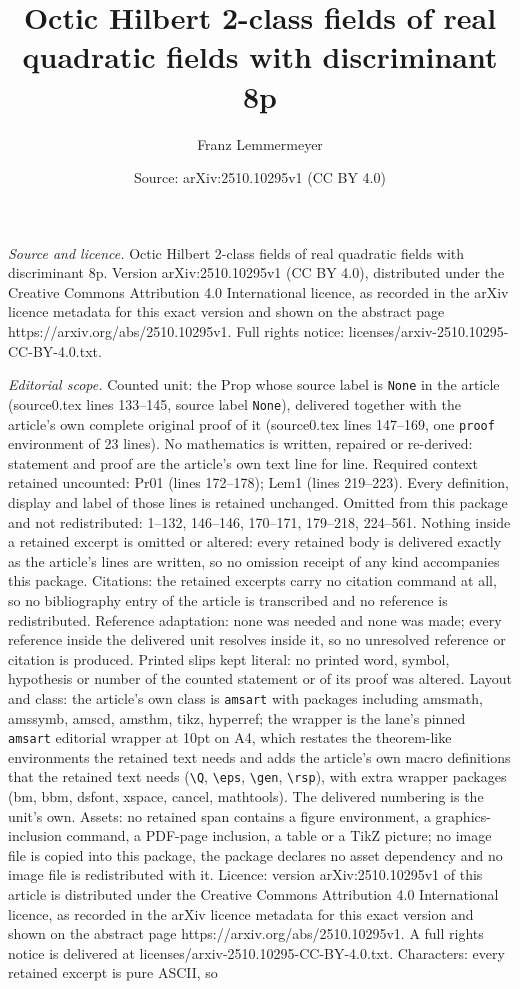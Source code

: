 \documentclass[10pt,a4paper]{amsart}
\title[Octic Hilbert 2-class fields of real quadratic fields with d]{Octic Hilbert 2-class fields of real quadratic fields with discriminant 8p}
\author{Franz Lemmermeyer}
\date{Source: arXiv:2510.10295v1 (CC BY 4.0)}
\begin{document}
\maketitle

\noindent\emph{Source and licence.} Octic Hilbert 2-class fields of real quadratic fields with discriminant 8p. Version arXiv:2510.10295v1 (CC BY 4.0), distributed under the Creative Commons Attribution 4.0 International licence, as recorded in the arXiv licence metadata for this exact version and shown on the abstract page https://arxiv.org/abs/2510.10295v1. Full rights notice: licenses/arxiv-2510.10295-CC-BY-4.0.txt.\par\smallskip

\noindent\textit{Editorial scope.} Counted unit: the Prop whose source label is \texttt{None} in the article (source0.tex lines 133--145, source label \texttt{None}), delivered together with the article's own complete original proof of it (source0.tex lines 147--169, one \texttt{proof} environment of 23 lines). No mathematics is written, repaired or re-derived: statement and proof are the article's own text line for line. Required context retained uncounted: Pr01 (lines 172--178); Lem1 (lines 219--223). Every definition, display and label of those lines is retained unchanged. Omitted from this package and not redistributed: 1--132, 146--146, 170--171, 179--218, 224--561. Nothing inside a retained excerpt is omitted or altered: every retained body is delivered exactly as the article's lines are written, so no omission receipt of any kind accompanies this package. Citations: the retained excerpts carry no citation command at all, so no bibliography entry of the article is transcribed and no reference is redistributed. Reference adaptation: none was needed and none was made; every reference inside the delivered unit resolves inside it, so no unresolved reference or citation is produced. Printed slips kept literal: no printed word, symbol, hypothesis or number of the counted statement or of its proof was altered. Layout and class: the article's own class is \texttt{amsart} with packages including amsmath, amssymb, amscd, amsthm, tikz, hyperref; the wrapper is the lane's pinned \texttt{amsart} editorial wrapper at 10pt on A4, which restates the theorem-like environments the retained text needs and adds the article's own macro definitions that the retained text needs (\texttt{\textbackslash Q}, \texttt{\textbackslash eps}, \texttt{\textbackslash gen}, \texttt{\textbackslash rsp}), with extra wrapper packages (bm, bbm, dsfont, xspace, cancel, mathtools). The delivered numbering is the unit's own. Assets: no retained span contains a figure environment, a graphics-inclusion command, a PDF-page inclusion, a table or a TikZ picture; no image file is copied into this package, the package declares no asset dependency and no image file is redistributed with it. Licence: version arXiv:2510.10295v1 of this article is distributed under the Creative Commons Attribution 4.0 International licence, as recorded in the arXiv licence metadata for this exact version and shown on the abstract page https://arxiv.org/abs/2510.10295v1. A full rights notice is delivered at licenses/arxiv-2510.10295-CC-BY-4.0.txt. Characters: every retained excerpt is pure ASCII, so 
\end{document}
